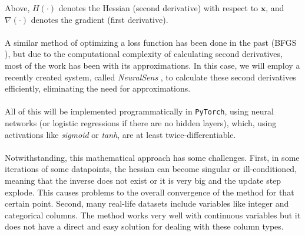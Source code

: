 \documentclass[12pt]{extarticle}
\numberwithin{equation}{section}
\begin{document}
Above, $H(\cdot)$ denotes the Hessian (second derivative) with respect to $\mathbf{x}$, 
and $\nabla(\cdot)$ denotes the gradient (first derivative).\\
\\
A similar method of optimizing a loss function has been done in the past (BFGS \cite{papakonstantinou2009historical}), 
but due to the computational complexity of calculating second derivatives, most of the work has been with its approximations. In this case, we will employ a recently created system, called 
\emph{NeuralSens} \cite{neuralsens}, to calculate these second derivatives efficiently, 
eliminating the need for approximations.\\
\\
All of this will be implemented programmatically in \texttt{PyTorch}, using neural networks (or logistic regressions if there are no hidden layers), which, using activations like \emph{sigmoid} or \emph{tanh}, are at least twice-differentiable.\\
\\
Notwithstanding, this mathematical approach has some challenges. 
First, in some iterations of some datapoints, the hessian can become singular or ill-conditioned, meaning that the inverse does not exist or it is very big and the update step explode. This causes problems to the overall convergence of the method for that certain point. 
Second, many real-life datasets include variables like integer and categorical columns. The method works very well with continuous variables but it does not have a direct and easy solution for dealing with these column types.
\end{document}
